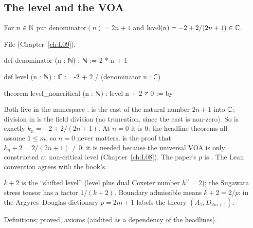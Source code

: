 \subsection{The level and the VOA}

\begin{definition}\label{l20:def:level}
For $n\in{\mathbb{N}}$ put $\mathrm{denominator}(n)=2n+1$ and $\mathrm{level}(n)=-2+2/(2n+1)\in{\mathbb{C}}$.
\end{definition}
\noindent File 
(Chapter~\ref{ch:L09}).
\begin{leancode}
def denominator (n : ℕ) : ℕ := 2 * n + 1

def level (n : ℕ) : ℂ := -2 + 2 / (denominator n : ℂ)

theorem level_noncritical (n : ℕ) : level n + 2 ≠ 0 := by
\end{leancode}

\begin{dictionary}
Both live in the namespace .  is the
cast of the natural number $2n+1$ into ${\mathbb{C}}$; division in  is the field division (no truncation, since
the cast is non-zero). So  is exactly $k_n=-2+2/(2n+1)$. At $n=0$ it is $0$; the headline
theorems all assume $1\le m$, so $n=0$ never matters.  is the proof that
$k_n+2=2/(2n+1)\neq0$; it is needed because the universal VOA is only constructed at non-critical level
(Chapter~\ref{ch:L08}). The paper's $p$ is . The Lean convention agrees with the book's.
\end{dictionary}

\begin{physics}
$k+2$ is the ``shifted level'' (level plus dual Coxeter number $h^\vee=2$); the Sugawara stress tensor has a
factor $1/(k+2)$. Boundary admissible means $k+2=2/p$: in the Argyres--Douglas dictionary $p=2m+1$ labels the
theory $(A_1,D_{2m+1})$.
\end{physics}

\begin{status}
Definitions;  proved, axioms  (audited
as a dependency of the headlines).
\end{status}

